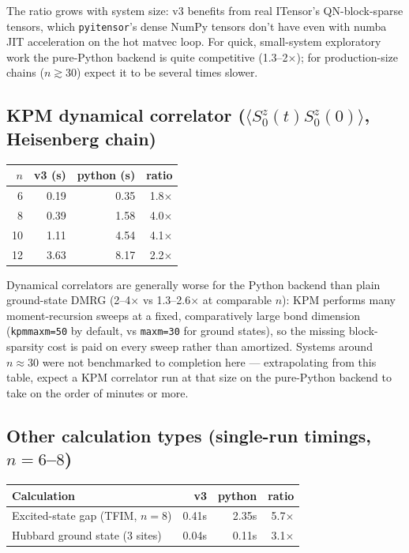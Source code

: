 \documentclass[11pt]{article}
\begin{document}
The ratio grows with system size: v3 benefits from real ITensor's
QN-block-sparse tensors, which \texttt{pyitensor}'s dense NumPy tensors
don't have even with numba JIT acceleration on the hot matvec loop. For
quick, small-system exploratory work the pure-Python backend is quite
competitive (1.3--2$\times$); for production-size chains ($n \gtrsim 30$)
expect it to be several times slower.

\subsection{KPM dynamical correlator ($\langle S^z_0(t) S^z_0(0)\rangle$, Heisenberg chain)}

\begin{center}
\begin{tabular}{rrrr}
\toprule
$n$ & v3 (s) & python (s) & ratio \\
\midrule
6  & 0.19 & 0.35 & 1.8$\times$ \\
8  & 0.39 & 1.58 & 4.0$\times$ \\
10 & 1.11 & 4.54 & 4.1$\times$ \\
12 & 3.63 & 8.17 & 2.2$\times$ \\
\bottomrule
\end{tabular}
\end{center}

Dynamical correlators are generally worse for the Python backend than
plain ground-state DMRG (2--4$\times$ vs 1.3--2.6$\times$ at comparable
$n$): KPM performs many moment-recursion sweeps at a fixed, comparatively
large bond dimension (\texttt{kpmmaxm=50} by default, vs
\texttt{maxm=30} for ground states), so the missing block-sparsity cost
is paid on every sweep rather than amortized. Systems around $n\approx
30$ were not benchmarked to completion here --- extrapolating from this
table, expect a KPM correlator run at that size on the pure-Python
backend to take on the order of minutes or more.

\subsection{Other calculation types (single-run timings, $n=6$--$8$)}

\begin{center}
\begin{tabular}{lrrr}
\toprule
Calculation & v3 & python & ratio \\
\midrule
Excited-state gap (TFIM, $n=8$) & 0.41s & 2.35s & 5.7$\times$ \\
Hubbard ground state (3 sites) & 0.04s & 0.11s & 3.1$\times$ \\
\bottomrule
\end{tabular}
\end{center}
\end{document}
